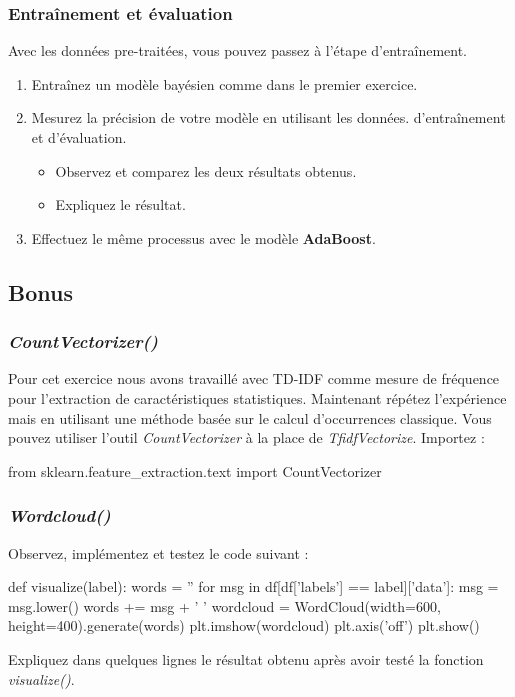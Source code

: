 \subsubsection{Entraînement et évaluation}
Avec les données pre-traitées, vous pouvez passez à l'étape d'entraînement.
\begin{enumerate}
	\item Entraînez un modèle bayésien comme dans le premier exercice.
	\item Mesurez la précision de votre modèle en utilisant les données. d'entraînement et d'évaluation.
	\begin{itemize}
		\item Observez et comparez les deux résultats obtenus.
		\item Expliquez le résultat.
	\end{itemize}
	\item Effectuez le même processus avec le modèle \textbf{AdaBoost}.
\end{enumerate}

\subsection{Bonus}

\subsubsection{\textit{CountVectorizer()}}
Pour cet exercice nous avons travaillé avec TD-IDF comme mesure de fréquence pour l'extraction de caractéristiques statistiques. Maintenant répétez l’expérience mais en utilisant une méthode basée sur le calcul d'occurrences classique. Vous pouvez utiliser l'outil \textit{CountVectorizer} à la place de \textit{TfidfVectorize}. Importez :

\begin{python}
from sklearn.feature_extraction.text import CountVectorizer
\end{python}

\subsubsection{\textit{Wordcloud()}}
Observez, implémentez et testez le code suivant :

\begin{python}
def visualize(label):
 words = ''
 for msg in df[df['labels'] == label]['data']:
  msg = msg.lower()
  words += msg + ' '
 wordcloud = WordCloud(width=600, height=400).generate(words)
 plt.imshow(wordcloud)
 plt.axis('off')
 plt.show()
\end{python}

Expliquez dans quelques lignes le résultat obtenu après avoir testé la fonction \textit{visualize()}.